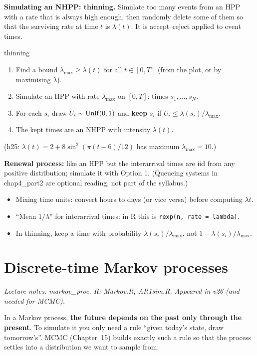 \textbf{Simulating an NHPP: thinning.} Simulate too many events from an HPP with a rate that is always high enough, then randomly delete some of them so that the surviving rate at time $t$ is $\lambda(t)$. It is accept--reject applied to event times.
\begin{algo}{thinning}
\begin{enumerate}
  \item Find a bound $\lambda_{\max}\ge\lambda(t)$ for all $t\in[0,T]$ (from the plot, or by maximising $\lambda$).
  \item Simulate an HPP with rate $\lambda_{\max}$ on $[0,T]$: times $s_1,\dots,s_N$.
  \item For each $s_i$ draw $U_i\sim\mathrm{Unif}(0,1)$ and \textbf{keep} $s_i$ if $U_i\le\lambda(s_i)/\lambda_{\max}$.
  \item The kept times are an NHPP with intensity $\lambda(t)$.
\end{enumerate}
\end{algo}
(h25: $\lambda(t) = 2+8\sin^2(\pi(t-6)/12)$ has maximum $\lambda_{\max}=10$.)

\textbf{Renewal process:} like an HPP but the interarrival times are iid from any positive distribution; simulate it with Option 1. (Queueing systems in chap4\_part2 are optional reading, not part of the syllabus.)

\begin{traps}
\begin{itemize}
  \item Mixing time units: convert hours to days (or vice versa) before computing $\lambda t$.
  \item ``Mean $1/\lambda$'' for interarrival times: in R this is \texttt{rexp(n, rate = lambda)}.
  \item In thinning, keep a time with probability $\lambda(s_i)/\lambda_{\max}$, not $1-\lambda(s_i)/\lambda_{\max}$.
\end{itemize}
\end{traps}

\section{Discrete-time Markov processes}
\textit{Lecture notes: markov\_proc. R: Markov.R, AR1sim.R. Appeared in v26 (and needed for MCMC).}

\begin{idea}
In a Markov process, \textbf{the future depends on the past only through the present}. To simulate it you only need a rule ``given today's state, draw tomorrow's''. MCMC (Chapter~15) builds exactly such a rule so that the process settles into a distribution we want to sample from.
\end{idea}

